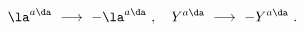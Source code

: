 \begin{equation}
\la^{a\da} ~\longrightarrow~ -\la^{a\da}~, ~~~
Y^{a\da}~ \longrightarrow~ -Y^{a\da}~.
\label{Z2 orbifold 1}
\end{equation}

